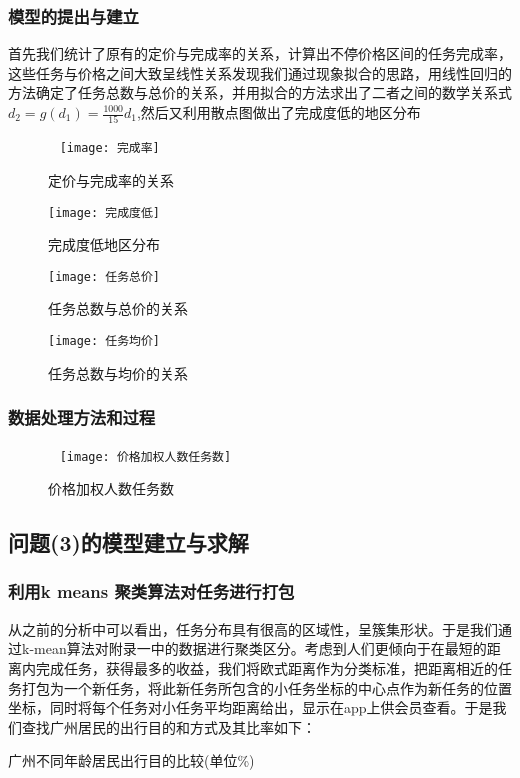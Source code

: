 \documentclass{ctexart}
\begin{document}
\subsubsection{模型的提出与建立}
首先我们统计了原有的定价与完成率的关系，计算出不停价格区间的任务完成率，这些任务与价格之间大致呈线性关系发现我们通过现象拟合的思路，用线性回归的方法确定了任务总数与总价的关系，并用拟合的方法求出了二者之间的数学关系式$d_2=g(d_1)=\frac{1000}{15}d_1$,然后又利用散点图做出了完成度低的地区分布
\begin{figure}[htbp]  
\centering
\texttt{[image: 完成率]} 
\caption{定价与完成率的关系}
\end{figure}
\begin{figure}[htbp] 
\centering
\texttt{[image: 完成度低]} 
\caption{完成度低地区分布}
\end{figure}
\begin{figure}[htbp] 
\centering
\texttt{[image: 任务总价]} 
\caption{任务总数与总价的关系}
\end{figure}
\begin{figure}[htbp] 
\centering
\texttt{[image: 任务均价]} 
\caption{任务总数与均价的关系}
\end{figure}

\subsubsection{数据处理方法和过程}
\begin{figure}[htbp]  
\centering
\texttt{[image: 价格加权人数任务数]} 
\caption{价格加权人数任务数}
\end{figure}
\newpage
\subsection{问题(3)的模型建立与求解}
\subsubsection{利用k means 聚类算法对任务进行打包}
从之前的分析中可以看出，任务分布具有很高的区域性，呈簇集形状。于是我们通过k-mean算法对附录一中的数据进行聚类区分。考虑到人们更倾向于在最短的距离内完成任务，获得最多的收益，我们将欧式距离作为分类标准，把距离相近的任务打包为一个新任务，将此新任务所包含的小任务坐标的中心点作为新任务的位置坐标，同时将每个任务对小任务平均距离给出，显示在app上供会员查看。于是我们查找广州居民的出行目的和方式及其比率如下：
\\
\centerline{广州不同年龄居民出行目的比较(单位\%)}
\end{document}
